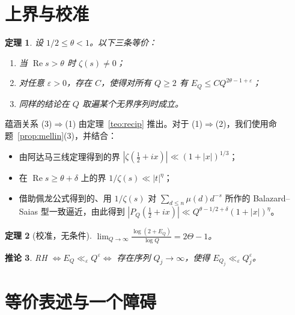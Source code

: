 \documentclass[11pt,a4paper]{amsart}
\newtheorem{teorema}{定理}
\newtheorem{corolario}[teorema]{推论}
\theoremstyle{definition}
\theoremstyle{remark}
\renewcommand{\Re}{\operatorname{Re}}
\begin{document}
\section{上界与校准}\label{sec:cotas}

\begin{teorema}\label{teo:theta}
设 $1/2\le\theta<1$。以下三条等价：
\begin{enumerate}
\item 当 $\Re s>\theta$ 时 $\zeta(s)\ne0$；
\item 对任意 $\varepsilon>0$，存在 $C$，使得对所有 $Q\ge2$ 有 $E_Q\le CQ^{2\theta-1+\varepsilon}$；
\item 同样的结论在 $Q$ 取遍某个无界序列时成立。
\end{enumerate}
\end{teorema}

蕴涵关系 (3)$\Rightarrow$(1) 由定理~\ref{teo:recip} 推出。对于 (1)$\Rightarrow$(2)，我们使用命题~\ref{prop:mellin}(3)，并结合：
\begin{itemize}
\item 由阿达马三线定理得到的界 $|\zeta(\tfrac12+ix)|\ll(1+|x|)^{1/3}$；
\item 在 $\Re s\ge\theta+\delta$ 上的界 $1/\zeta(s)\ll|t|^\eta$；
\item 借助佩龙公式得到的、用 $1/\zeta(s)$ 对 $\sum_{d\le n}\mu(d)d^{-s}$ 所作的 Balazard--Saias 型一致逼近，由此得到 $|P_Q(\tfrac12+ix)|\ll Q^{\theta-1/2+\delta}(1+|x|)^\eta$。
\end{itemize}

\begin{teorema}[校准，无条件]\label{teo:calibracion}
$\displaystyle\lim_{Q\to\infty}\frac{\log(2+E_Q)}{\log Q}=2\Theta-1$。
\end{teorema}

\begin{corolario}
RH $\iff E_Q\ll_\varepsilon Q^\varepsilon\iff$ 存在序列 $Q_j\to\infty$，使得 $E_{Q_j}\ll_\varepsilon Q_j^\varepsilon$。
\end{corolario}

\section{等价表述与一个障碍}\label{sec:equiv}
\end{document}
